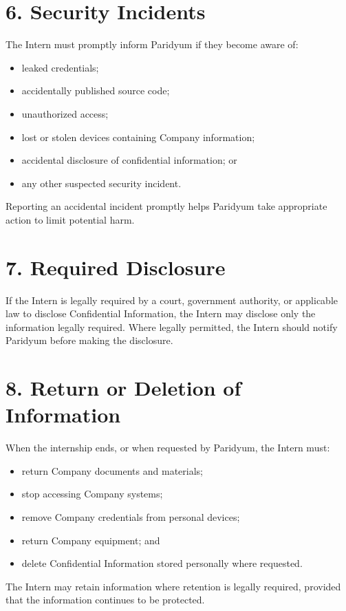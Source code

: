 \documentclass{paridyum}
\begin{document}
\section*{6. Security Incidents}
The Intern must promptly inform Paridyum if they become aware of:
\begin{itemize}[leftmargin=*, noitemsep]
    \item leaked credentials;
    \item accidentally published source code;
    \item unauthorized access;
    \item lost or stolen devices containing Company information;
    \item accidental disclosure of confidential information; or
    \item any other suspected security incident.
\end{itemize}
Reporting an accidental incident promptly helps Paridyum take appropriate action
to limit potential harm.

\section*{7. Required Disclosure}
If the Intern is legally required by a court, government authority, or applicable
law to disclose Confidential Information, the Intern may disclose only the
information legally required. Where legally permitted, the Intern should notify
Paridyum before making the disclosure.

\section*{8. Return or Deletion of Information}
When the internship ends, or when requested by Paridyum, the Intern must:
\begin{itemize}[leftmargin=*, noitemsep]
    \item return Company documents and materials;
    \item stop accessing Company systems;
    \item remove Company credentials from personal devices;
    \item return Company equipment; and
    \item delete Confidential Information stored personally where requested.
\end{itemize}
The Intern may retain information where retention is legally required, provided
that the information continues to be protected.
\end{document}
